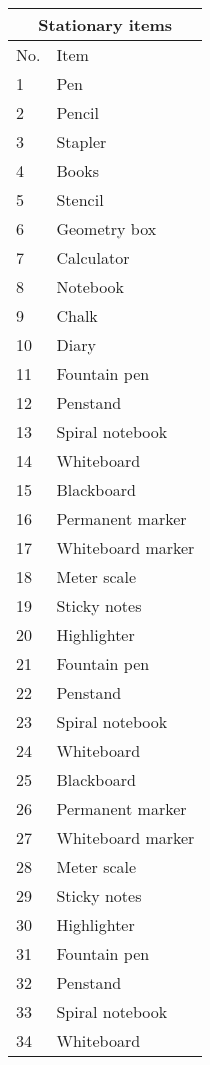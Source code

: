\documentclass{article}
\begin{document}
	\begin{longtable}{|l|l|}
		\hline
		\multicolumn{2}{|c|}{Stationary items}\\
		\hline
		No. & Item \\
		\hline
		1 & Pen \\
		\hline
		2 & Pencil \\
		\hline
		3 & Stapler \\
		\hline
		4 & Books \\
		\hline
		5 & Stencil \\
		\hline
		6 & Geometry box \\
		\hline
		7 & Calculator \\
		\hline
		8 & Notebook \\
		\hline
		9 & Chalk \\
		\hline
		10 & Diary \\
		\hline
		11 & Fountain pen \\
		\hline
		12 & Penstand \\
		\hline
		13 & Spiral notebook \\
		\hline
		14 & Whiteboard \\
		\hline
		15 & Blackboard \\
		\hline
		16 & Permanent marker \\
		\hline
		17 & Whiteboard marker \\
		\hline
		18 & Meter scale \\
		\hline
		19 & Sticky notes \\
		\hline
		20 & Highlighter \\
		\hline
		21 & Fountain pen \\
		\hline
		22 & Penstand \\
		\hline
		23 & Spiral notebook \\
		\hline
		24 & Whiteboard \\
		\hline
		25 & Blackboard \\
		\hline
		26 & Permanent marker \\
		\hline
		27 & Whiteboard marker \\
		\hline
		28 & Meter scale \\
		\hline
		29 & Sticky notes \\
		\hline
		30 & Highlighter \\
		\hline
		31 & Fountain pen \\
		\hline
		32 & Penstand \\
		\hline
		33 & Spiral notebook \\
		\hline
		34 & Whiteboard \\

\end{longtable}
\end{document}
